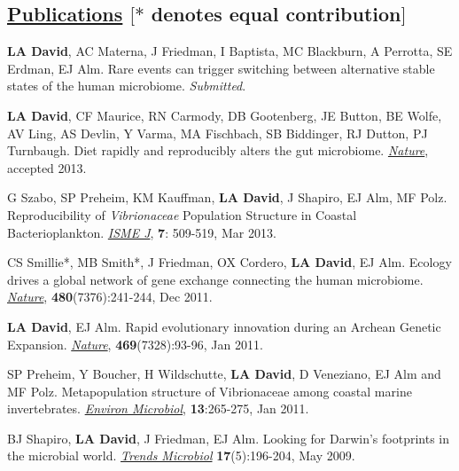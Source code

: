 \documentclass[overlapped,line,11pt]{res}
\begin{document}
\begin{resume}
\section{\underline{\sc Publications} \hspace{2.95in} \sc $[\ast$ denotes equal
      contribution$]$}

\vspace{.25in}

\begin{revnumerate}[11]

\item {\textbf{LA David}, AC Materna, J Friedman, I Baptista, MC
  Blackburn, A Perrotta, SE Erdman, EJ Alm.  Rare events can
  trigger switching between alternative stable states of the human
  microbiome.  \emph{Submitted}.}

\item {\textbf{LA David}, CF Maurice, RN Carmody, DB Gootenberg, JE
  Button, BE Wolfe, AV Ling, AS Devlin, Y Varma, MA Fischbach, SB
  Biddinger, RJ Dutton, PJ Turnbaugh.  Diet rapidly and reproducibly
  alters the gut microbiome. \emph{\underline{Nature}}, accepted 2013.}

\item {G Szabo, SP Preheim, KM Kauffman, \textbf{LA David}, J Shapiro,
  EJ Alm, MF Polz.  Reproducibility of \emph{Vibrionaceae} Population
  Structure in Coastal Bacterioplankton. \emph{\underline{ISME J}},
  \textbf{7}: 509-519, Mar 2013.}

\item {CS Smillie*, MB Smith*, J Friedman, OX Cordero, \textbf{LA
    David}, EJ Alm.  Ecology drives a global network of gene exchange
  connecting the human microbiome. \emph{\underline{Nature}},
  \textbf{480}(7376):241-244, Dec 2011.}

\item {\textbf{LA David}, EJ Alm.  Rapid evolutionary innovation during
  an Archean Genetic Expansion.  \emph{\underline{Nature}},
  \textbf{469}(7328):93-96, Jan 2011.}

\vspace*{1mm}
\item {SP Preheim, Y Boucher, H Wildschutte, \textbf{LA David},
  D Veneziano, EJ Alm and MF Polz.  Metapopulation
  structure of Vibrionaceae among coastal marine
  invertebrates. \emph{\underline{Environ Microbiol}}, \textbf{13}:265-275, Jan 2011.} 

\vspace*{1mm}
\item {BJ Shapiro, \textbf{LA David}, J Friedman, EJ Alm. Looking for
Darwin's footprints in the microbial world.  \emph{\underline{Trends Microbiol}}
\textbf{17}(5):196-204, May 2009.}


\end{revnumerate}
\end{resume}
\end{document}
